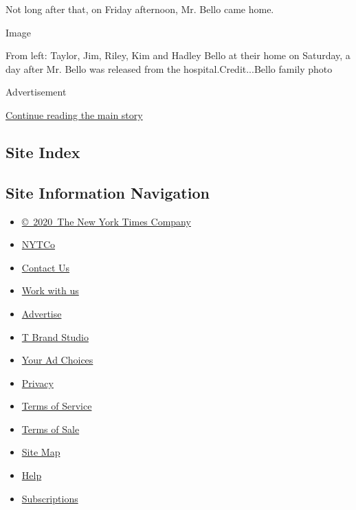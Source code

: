 Not long after that, on Friday afternoon, Mr. Bello came home.

Image

From left: Taylor, Jim, Riley, Kim and Hadley Bello at their home on
Saturday, a day after Mr. Bello was released from the
hospital.Credit...Bello family photo

Advertisement

\protect\hyperlink{after-bottom}{Continue reading the main story}

\hypertarget{site-index}{%
\subsection{Site Index}\label{site-index}}

\hypertarget{site-information-navigation}{%
\subsection{Site Information
Navigation}\label{site-information-navigation}}

\begin{itemize}
\tightlist
\item
  \href{https://help.nytimes3xbfgragh.onion/hc/en-us/articles/115014792127-Copyright-notice}{©~2020~The
  New York Times Company}
\end{itemize}

\begin{itemize}
\tightlist
\item
  \href{https://www.nytco.com/}{NYTCo}
\item
  \href{https://help.nytimes3xbfgragh.onion/hc/en-us/articles/115015385887-Contact-Us}{Contact
  Us}
\item
  \href{https://www.nytco.com/careers/}{Work with us}
\item
  \href{https://nytmediakit.com/}{Advertise}
\item
  \href{http://www.tbrandstudio.com/}{T Brand Studio}
\item
  \href{https://www.nytimes3xbfgragh.onion/privacy/cookie-policy\#how-do-i-manage-trackers}{Your
  Ad Choices}
\item
  \href{https://www.nytimes3xbfgragh.onion/privacy}{Privacy}
\item
  \href{https://help.nytimes3xbfgragh.onion/hc/en-us/articles/115014893428-Terms-of-service}{Terms
  of Service}
\item
  \href{https://help.nytimes3xbfgragh.onion/hc/en-us/articles/115014893968-Terms-of-sale}{Terms
  of Sale}
\item
  \href{https://spiderbites.nytimes3xbfgragh.onion}{Site Map}
\item
  \href{https://help.nytimes3xbfgragh.onion/hc/en-us}{Help}
\item
  \href{https://www.nytimes3xbfgragh.onion/subscription?campaignId=37WXW}{Subscriptions}
\end{itemize}
